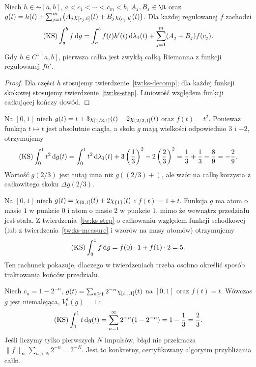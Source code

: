\begin{wniosek}
\label{wn:ks-ac-jumps}
Niech $h\in\AC[a,b]$, $a<c_1<\cdots<c_m<b$, $A_j,B_j\in\R$ oraz
$g(t)=h(t)+\sum_{j=1}^m\bigl(A_j\chi_{[c_j,b]}(t)+B_j\chi_{(c_j,b]}(t)\bigr)$. Dla każdej regulowanej $f$ zachodzi
\[
 (\mathrm{KS})\int_a^b f\,\mathrm dg
 =\int_a^b f(t)h'(t)\,\mathrm d\lambda_1(t)
 +\sum_{j=1}^m(A_j+B_j)f(c_j).
\]
Gdy $h\in C^1[a,b]$, pierwsza całka jest zwykłą całką Riemanna z funkcji regulowanej $fh'$.
\end{wniosek}
\begin{proof}
Dla części $h$ stosujemy twierdzenie~\ref{tw:ks-decomp}; dla każdej funkcji skokowej stosujemy twierdzenie~\ref{tw:ks-step}. Liniowość względem funkcji całkującej kończy dowód.
\end{proof}

\begin{przyklad}
Na $[0,1]$ niech $g(t)=t+3\chi_{[1/3,1]}(t)-2\chi_{(2/3,1]}(t)$ oraz $f(t)=t^2$. Ponieważ funkcja $t\mapsto t$ jest absolutnie ciągła, a skoki $g$ mają wielkości odpowiednio $3$ i $-2$, otrzymujemy
\[
 (\mathrm{KS})\int_0^1 t^2\,\mathrm dg(t)
 =\int_0^1 t^2\,\mathrm d\lambda_1(t)
 +3\left(\frac13\right)^2-2\left(\frac23\right)^2
 =\frac13+\frac13-\frac89=-\frac29.
\]
Wartość $g(2/3)$ jest tutaj inna niż $g((2/3)+)$, ale wzór na całkę korzysta z całkowitego skoku $\Delta g(2/3)$.
\end{przyklad}

\begin{przyklad}
Na $[0,1]$ niech $g(t)=\chi_{(0,1]}(t)+2\chi_{\{1\}}(t)$ i $f(t)=1+t$. Funkcja $g$ ma atom o masie $1$ w punkcie $0$ i atom o masie $2$ w punkcie $1$, mimo że wewnątrz przedziału jest stała. Z twierdzenia~\ref{tw:ks-step} o całkowaniu względem funkcji schodkowej (lub z twierdzenia~\ref{tw:ks-measure} i wzorów na masy atomów) otrzymujemy
\[
 (\mathrm{KS})\int_0^1 f\,\mathrm dg=f(0)\cdot1+f(1)\cdot2=5.
\]
Ten rachunek pokazuje, dlaczego w twierdzeniach trzeba osobno określić sposób traktowania końców przedziału.
\end{przyklad}

\begin{przyklad}
Niech $c_n=1-2^{-n}$, $g(t)=\sum_{n\ge1}2^{-n}\chi_{[c_n,1]}(t)$ na $[0,1]$ oraz $f(t)=t$. Wówczas $g$ jest niemalejąca, $V_0^1(g)=1$ i
\[
 (\mathrm{KS})\int_0^1 t\,\mathrm dg(t)
 =\sum_{n=1}^\infty2^{-n}(1-2^{-n})
 =1-\frac13=\frac23.
\]
Jeśli liczymy tylko pierwszych $N$ impulsów, błąd nie przekracza $\|f\|_\infty\sum_{n>N}2^{-n}=2^{-N}$. Jest to konkretny, certyfikowany algorytm przybliżania całki.
\end{przyklad}

